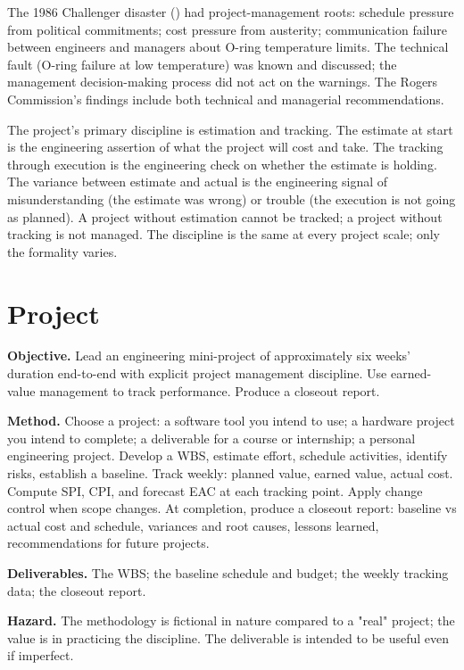 The 1986 Challenger disaster (\cite{acc:nasa-challenger}) had project-management roots: schedule pressure from political commitments; cost pressure from austerity; communication failure between engineers and managers about O-ring temperature limits. The technical fault (O-ring failure at low temperature) was known and discussed; the management decision-making process did not act on the warnings. The Rogers Commission's findings include both technical and managerial recommendations.

\begin{principle}
The project's primary discipline is estimation and tracking. The estimate at start is the engineering assertion of what the project will cost and take. The tracking through execution is the engineering check on whether the estimate is holding. The variance between estimate and actual is the engineering signal of misunderstanding (the estimate was wrong) or trouble (the execution is not going as planned). A project without estimation cannot be tracked; a project without tracking is not managed. The discipline is the same at every project scale; only the formality varies.
\end{principle}

\section{Project}

\begin{project}
\textbf{Objective.} Lead an engineering mini-project of approximately six weeks' duration end-to-end with explicit project management discipline. Use earned-value management to track performance. Produce a closeout report.

\textbf{Method.} Choose a project: a software tool you intend to use; a hardware project you intend to complete; a deliverable for a course or internship; a personal engineering project. Develop a WBS, estimate effort, schedule activities, identify risks, establish a baseline. Track weekly: planned value, earned value, actual cost. Compute SPI, CPI, and forecast EAC at each tracking point. Apply change control when scope changes. At completion, produce a closeout report: baseline vs actual cost and schedule, variances and root causes, lessons learned, recommendations for future projects.

\textbf{Deliverables.} The WBS; the baseline schedule and budget; the weekly tracking data; the closeout report.

\textbf{Hazard.} The methodology is fictional in nature compared to a "real" project; the value is in practicing the discipline. The deliverable is intended to be useful even if imperfect.
\end{project}


